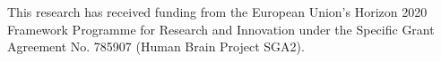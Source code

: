 This research has received funding from the European Union’s Horizon 2020 Framework Programme for Research and Innovation under the Specific Grant Agreement No. 785907 (Human Brain Project SGA2).
